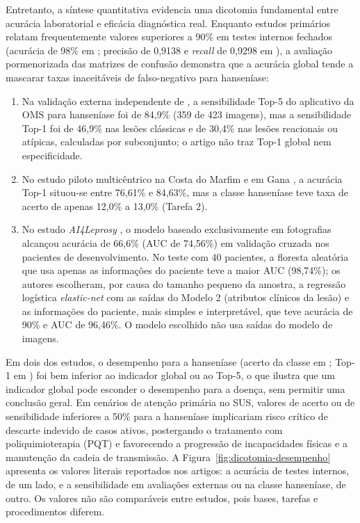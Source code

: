 Entretanto, a síntese quantitativa evidencia uma dicotomia fundamental entre acurácia
laboratorial e eficácia diagnóstica real. Enquanto estudos primários relatam frequentemente
valores superiores a 90\% em testes internos fechados (acurácia de 98\% em ; precisão de 0,9138 e \textit{recall} de 0,9298 em ),
a avaliação pormenorizada das matrizes de confusão demonstra que a acurácia global tende a
mascarar taxas inaceitáveis de falso-negativo para hanseníase:
\begin{enumerate}
    \item Na validação externa independente de , a sensibilidade Top-5 do
    aplicativo da OMS para hanseníase foi de 84,9\% (359 de 423 imagens), mas a sensibilidade Top-1
    foi de 46,9\% nas lesões clássicas e de 30,4\% nas lesões reacionais ou atípicas, calculadas
    por subconjunto; o artigo não traz Top-1 global nem especificidade.
    \item No estudo piloto multicêntrico na Costa do Marfim e em Gana , a
    acurácia Top-1 situou-se entre 76,61\% e 84,63\%, mas a classe hanseníase teve taxa de acerto
    de apenas 12,0\% a 13,0\% (Tarefa 2).
    \item No estudo \textit{AI4Leprosy} , o modelo baseado exclusivamente
    em fotografias alcançou acurácia de 66,6\% (AUC de 74,56\%) em validação cruzada nos pacientes de
    desenvolvimento. No teste com 40 pacientes, a floresta aleatória que usa apenas as informações do
    paciente teve a maior AUC (98,74\%); os autores escolheram, por causa do tamanho pequeno da amostra,
    a regressão logística \textit{elastic-net} com as saídas do Modelo 2 (atributos clínicos da lesão) e as
    informações do paciente, mais simples e interpretável, que teve acurácia de 90\% e AUC de 96,46\%. O
    modelo escolhido não usa saídas do modelo de imagens.
\end{enumerate}

Em dois dos estudos, o desempenho para a hanseníase (acerto da classe em ;
Top-1 em ) foi bem inferior ao indicador global ou ao Top-5, o que ilustra que
um indicador global pode esconder o desempenho para a doença, sem permitir uma conclusão geral.
Em cenários de atenção primária no SUS, valores de acerto ou de sensibilidade inferiores a 50\%
para a hanseníase implicariam risco crítico de descarte
indevido de casos ativos, postergando o tratamento com poliquimioterapia (PQT) e favorecendo
a progressão de incapacidades físicas e a manutenção da cadeia de transmissão. A
Figura~\ref{fig:dicotomia-desempenho} apresenta os valores literais reportados nos artigos: a acurácia de
testes internos, de um lado, e a sensibilidade em avaliações externas ou na classe hanseníase, de outro.
Os valores não são comparáveis entre estudos, pois bases, tarefas e procedimentos diferem.

